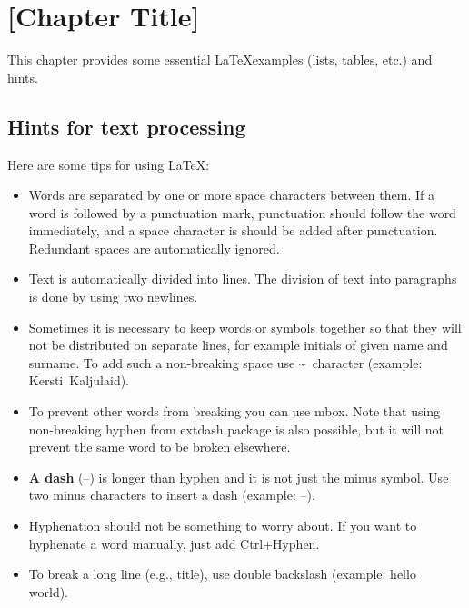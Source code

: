 \section{[Chapter Title]}

This chapter provides some essential \LaTeX examples (lists, tables,
etc.) and hints.

\subsection{Hints for text processing}

Here are some tips for using \LaTeX:

\begin{itemize}
\item Words are separated by one or       more space characters between
  them. If a word is followed by a punctuation mark, punctuation should
  follow the word immediately, and a space character is should be added
  after punctuation. Redundant
  spaces      are
  automatically             ignored.

\item Text is automatically divided into lines. The division of text
  into paragraphs is done by using two newlines.

\item Sometimes it is necessary to keep words or symbols together so
  that they will not be distributed on separate lines, for example
  initials of given name and surname. To add such a non-breaking space
  use \textasciitilde\ character (example: Kersti~Kaljulaid).

\item To prevent other words from breaking you can use mbox. Note
  that using \mbox{non-breaking} hyphen from extdash package is also
  possible, but it will not prevent the same word to be broken
  elsewhere.

\item \textbf{A dash} (--) is longer than hyphen and it is not just
  the minus symbol. Use two minus characters to insert a dash
  (example: --).

\item Hyphenation should not be something to worry about. If you want to hyphenate a
  word manually, just add Ctrl+Hyphen.

\item To break a long line (e.g., title), use double backslash (example: hello\\world).
\end{itemize}

